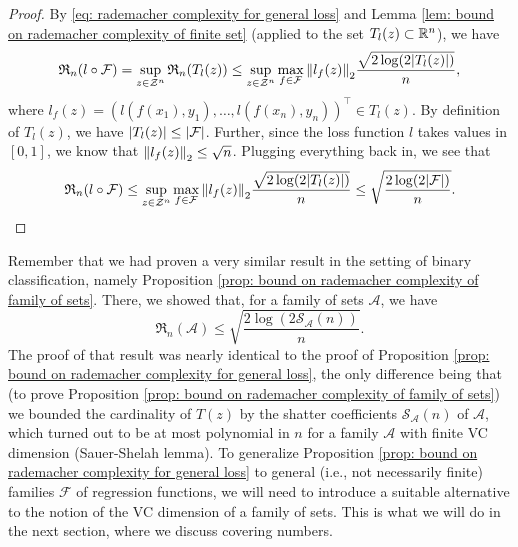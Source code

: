 \begin{proof}
By \eqref{eq: rademacher complexity for general loss} and Lemma \ref{lem: bound on rademacher complexity of finite set} (applied to the set $T_l(z) \subset \mathbb{R}^n$), we have
\[
    \mathfrak{R}_n(l \circ \mathcal{F}) = \sup_{z \in \mathcal{Z}^n} \mathfrak{R}_n(T_l(z)) \leq \sup_{z \in \mathcal{Z}^n} \max_{f \in \mathcal{F}} \norm{l_f(z)}_2 \frac{\sqrt{2 \log(2 \abs{T_l(z)})}}{n},
\]
where $l_f(z) = (l(f(x_1), y_1), \dots, l(f(x_n), y_n))^{\top} \in T_l(z)$. By definition of $T_l(z)$, we have $\abs{T_l(z)} \leq \abs{\mathcal{F}}$. Further, since the loss function $l$ takes values in $[0, 1]$, we know that $\norm{l_f(z)}_2 \leq \sqrt{n}$. Plugging everything back in, we see that
\[
    \mathfrak{R}_n(l \circ \mathcal{F}) \leq \sup_{z \in \mathcal{Z}^n} \max_{f \in \mathcal{F}} \norm{l_f(z)}_2 \frac{\sqrt{2 \log(2 \abs{T_l(z)})}}{n} \leq \sqrt{\frac{2 \log(2 \abs{\mathcal{F}})}{n}}. \qedhere
\]
\end{proof}

Remember that we had proven a very similar result in the setting of binary classification, namely Proposition \ref{prop: bound on rademacher complexity of family of sets}. There, we showed that, for a family of sets $\mathcal{A}$, we have
\[
    \mathfrak{R}_n(\mathcal{A}) \leq \sqrt{\frac{2 \log(2 \mathcal{S}_{\mathcal{A}}(n))}{n}}.
\]
The proof of that result was nearly identical to the proof of Proposition \ref{prop: bound on rademacher complexity for general loss}, the only difference being that (to prove Proposition \ref{prop: bound on rademacher complexity of family of sets}) we bounded the cardinality of $T(z)$ by the shatter coefficients $\mathcal{S}_{\mathcal{A}}(n)$ of $\mathcal{A}$, which turned out to be at most polynomial in $n$ for a family $\mathcal{A}$ with finite VC dimension (Sauer-Shelah lemma). To generalize Proposition \ref{prop: bound on rademacher complexity for general loss} to general (i.e., not necessarily finite) families $\mathcal{F}$ of regression functions, we will need to introduce a suitable alternative to the notion of the VC dimension of a family of sets. This is what we will do in the next section, where we discuss covering numbers.

